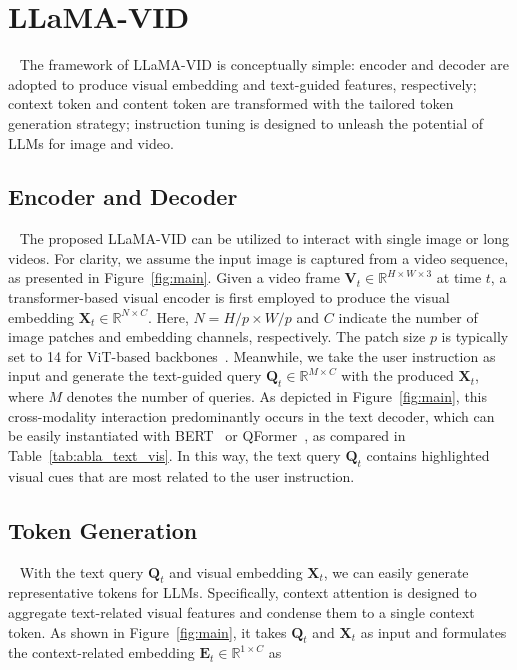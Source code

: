 \section{LLaMA-VID}~\label{sec:method}
The framework of LLaMA-VID is conceptually simple: encoder and decoder are adopted to produce visual embedding and text-guided features, respectively; 
context token and content token are transformed with the tailored token generation strategy; 
instruction tuning is designed to unleash the potential of LLMs for image and video.

\subsection{Encoder and Decoder}~\label{sec:sub_encoder}
The proposed LLaMA-VID can be utilized to interact with single image or long videos.
For clarity, we assume the input image is captured from a video sequence, as presented in Figure~\ref{fig:main}.
Given a video frame ${\mathbf V}_t\in\mathbb{R}^{H\times W\times 3}$ at time $t$, a transformer-based visual encoder is first employed to produce the visual embedding  ${\mathbf X}_t\in\mathbb{R}^{N\times C}$. Here, $N=H/p\times W/p$ and $C$ indicate the number of image patches and embedding channels, respectively.
The patch size $p$ is typically set to 14 for ViT-based backbones~\cite{vit,CLIP,evaclip}.
Meanwhile, we take the user instruction as input and generate the text-guided query ${\mathbf Q}_t\in\mathbb{R}^{M\times C}$ with the produced ${\mathbf X}_t$, where $M$ denotes the number of queries.
As depicted in Figure~\ref{fig:main}, this cross-modality interaction predominantly occurs in the text decoder, which can be easily instantiated with BERT~\cite{devlin2018bert} or QFormer~\cite{instructblip}, as compared in Table~\ref{tab:abla_text_vis}.
In this way, the text query ${\mathbf Q}_t$ contains highlighted visual cues that are most related to the user instruction.

\subsection{Token Generation}~\label{sec:sub_token}
With the text query ${\mathbf Q}_t$ and visual embedding ${\mathbf X}_t$, we can easily generate representative tokens for LLMs.
Specifically, context attention is designed to aggregate text-related visual features and condense them to a single context token.
As shown in Figure~\ref{fig:main}, it takes ${\mathbf Q}_t$ and ${\mathbf X}_t$ as input and formulates the context-related embedding ${\mathbf E}_t\in\mathbb{R}^{1\times C}$ as


